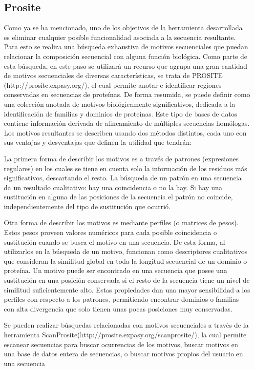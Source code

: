 \subsection{Prosite}
Como ya se ha mencionado, uno de los objetivos de la herramienta desarrollada es eliminar cualquier posible funcionalidad asociada a la secuencia resultante. Para esto se realiza una búsqueda exhaustiva de motivos secuenciales que puedan relacionar la composición secuencial con alguna función biológica.
Como parte de esta búsqueda, en este paso se utilizará un recurso que agrupa una gran cantidad de motivos secuenciales de diversas características, se trata de PROSITE (http://prosite.expasy.org/), el cual permite anotar e identificar regiones conservadas en secuencias de proteínas.
De forma resumida, se puede definir como una colección anotada de motivos biológicamente significativos, dedicada a la identificación de familias y dominios de proteínas.
Este tipo de bases de datos contiene información derivada de alineamiento de múltiples secuencias homólogas. Los motivos resultantes se describen usando dos métodos distintos, cada uno con sus ventajas y desventajas que definen la utilidad que tendrán:

La primera forma de describir los motivos es a través de patrones (expresiones regulares) en los cuales se tiene en cuenta solo la información de los residuos más significativos, descartando el resto. La búsqueda de un patrón en una secuencia da un resultado cualitativo: hay una coincidencia o no la hay. Si hay una sustitución en alguna de las posiciones de la secuencia el patrón no coincide, independientemente del tipo de sustitución que ocurrió.

Otra forma de describir los motivos es mediante perfiles (o matrices de pesos). Estos pesos proveen valores numéricos para cada posible coincidencia o sustitución cuando se busca el motivo en una secuencia. De esta forma, al utilizarlos en la búsqueda de un motivo, funcionan como descriptores cualitativos que consideran la similitud global en toda la longitud secuencial de un dominio o proteína. Un motivo puede ser encontrado en una secuencia que posee una sustitución en una posición conservada si el resto de la secuencia tiene un nivel de similitud suficientemente alto.
Estas propiedades dan una mayor sensibilidad a los perfiles con respecto a los patrones, permitiendo encontrar dominios o familias con alta divergencia que solo tienen unas pocas posiciones muy conservadas.


Se pueden realizar búsquedas relacionadas con motivos secuenciales a través de la herramienta ScanProsite(http://prosite.expasy.org/scanprosite/), la cual permite escanear secuencias para buscar ocurrencias de los motivos, buscar motivos en una base de datos entera de secuencias, o buscar motivos propios del usuario en una secuencia

